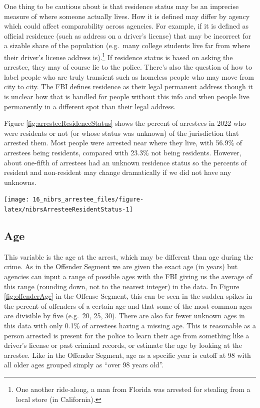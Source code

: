 \documentclass[
]{krantz}
\let\origfigure\figure
\let\endorigfigure\endfigure
\renewenvironment{figure}[1][2] {
    \expandafter\origfigure\expandafter[H]
} {
    \endorigfigure
}
\begin{document}
One thing to be cautious about is that residence status may
be an imprecise measure of where someone actually lives. How
it is defined may differ by agency which could affect
comparability across agencies. For example, if it is defined
as official residence (such as address on a driver's
license) that may be incorrect for a sizable share of the
population (e.g.~many college students live far from where
their driver's license address is).\footnote{One another
  ride-along, a man from Florida was arrested for stealing
  from a local store (in California).} If residence status
is based on asking the arrestee, they may of course lie to
the police. There's also the question of how to label people
who are truly transient such as homeless people who may move
from city to city. The FBI defines residence as their legal
permanent address though it is unclear how that is handled
for people without this info and when people live
permanently in a different spot than their legal address.

Figure \ref{fig:arresteeResidenceStatus} shows the percent
of arrestees in 2022 who were residents or not (or whose
status was unknown) of the jurisdiction that arrested them.
Most people were arrested near where they live, with 56.9\%
of arrestees being residents, compared with 23.3\% not being
residents. However, about one-fifth of arrestees had an
unknown residence status so the percents of resident and
non-resident may change dramatically if we did not have any
unknowns.

\begin{figure}

{\centering \texttt{[image: 16\_nibrs\_arrestee\_files/figure-latex/nibrsArresteeResidentStatus-1]} 

}

\caption{Annual resident status (i.e. if they live in the arresting jurisdiction) of arrestees, 1991-2022.}\label{fig:nibrsArresteeResidentStatus}
\end{figure}

\subsection{Age}\label{age-4}

This variable is the age at the arrest, which may be
different than age during the crime. As in the Offender
Segment we are given the exact age (in years) but agencies
can input a range of possible ages with the FBI giving us
the average of this range (rounding down, not to the nearest
integer) in the data. In Figure \ref{fig:offenderAge} in the
Offense Segment, this can be seen in the sudden spikes in
the percent of offenders of a certain age and that some of
the most common ages are divisible by five (e.g.~20, 25,
30). There are also far fewer unknown ages in this data with
only 0.1\% of arrestees having a missing age. This is
reasonable as a person arrested is present for the police to
learn their age from something like a driver's license or
past criminal records, or estimate the age by looking at the
arrestee. Like in the Offender Segment, age as a specific
year is cutoff at 98 with all older ages grouped simply as
``over 98 years old''.
\end{document}
